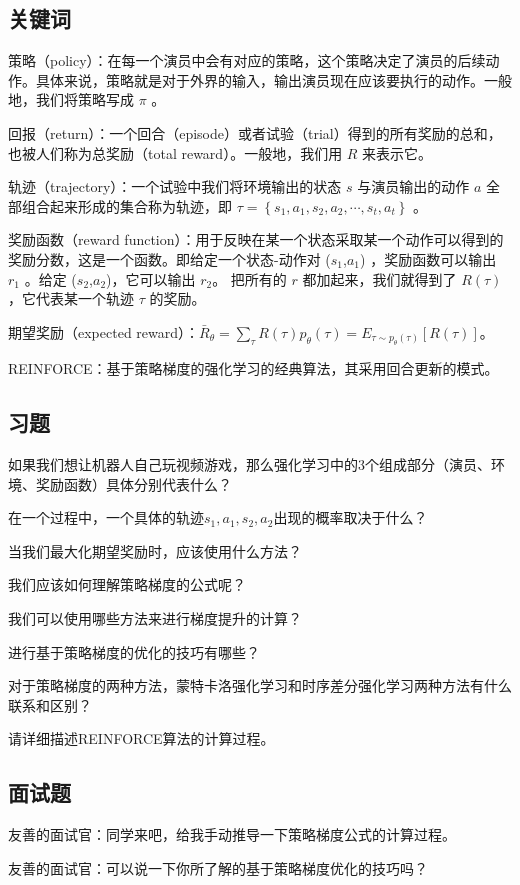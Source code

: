\subsection{关键词}

策略（policy）：在每一个演员中会有对应的策略，这个策略决定了演员的后续动作。具体来说，策略就是对于外界的输入，输出演员现在应该要执行的动作。一般地，我们将策略写成 $\pi$ 。

回报（return）：一个回合（episode）或者试验（trial）得到的所有奖励的总和，也被人们称为总奖励（total reward）。一般地，我们用 $R$ 来表示它。

轨迹（trajectory）：一个试验中我们将环境输出的状态 $s$ 与演员输出的动作 $a$ 全部组合起来形成的集合称为轨迹，即 $\tau=\left\{s_{1}, a_{1}, s_{2}, a_{2}, \cdots, s_{t}, a_{t}\right\}$ 。

奖励函数（reward function）：用于反映在某一个状态采取某一个动作可以得到的奖励分数，这是一个函数。即给定一个状态-动作对 ($s_1$,$a_1$) ，奖励函数可以输出 $r_1$ 。给定 ($s_2$,$a_2$)，它可以输出 $r_2$。 把所有的 $r$ 都加起来，我们就得到了 $R(\tau)$ ，它代表某一个轨迹 $\tau$ 的奖励。

期望奖励（expected reward）：$\bar{R}_{\theta}=\sum_{\tau} R(\tau) p_{\theta}(\tau)=E_{\tau \sim p_{\theta}(\tau)}[R(\tau)]$。

REINFORCE：基于策略梯度的强化学习的经典算法，其采用回合更新的模式。


\subsection{习题}

 如果我们想让机器人自己玩视频游戏，那么强化学习中的3个组成部分（演员、环境、奖励函数）具体分别代表什么？

 在一个过程中，一个具体的轨迹{$s_1 , a_1 , s_2 , a_2$}出现的概率取决于什么？

 当我们最大化期望奖励时，应该使用什么方法？

 我们应该如何理解策略梯度的公式呢？

 我们可以使用哪些方法来进行梯度提升的计算？

 进行基于策略梯度的优化的技巧有哪些？

 对于策略梯度的两种方法，蒙特卡洛强化学习和时序差分强化学习两种方法有什么联系和区别？

 请详细描述REINFORCE算法的计算过程。


\subsection{面试题}

 友善的面试官：同学来吧，给我手动推导一下策略梯度公式的计算过程。

 友善的面试官：可以说一下你所了解的基于策略梯度优化的技巧吗？

